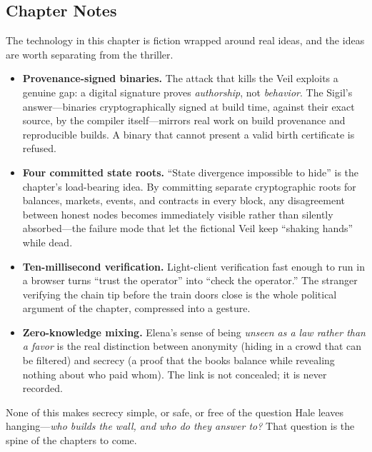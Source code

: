\hypertarget{chapter-6-notes}{%
\subsection{Chapter Notes}\label{chapter-6-notes}}

The technology in this chapter is fiction wrapped around real ideas, and the
ideas are worth separating from the thriller.

\begin{itemize}
\item
  \textbf{Provenance-signed binaries.} The attack that kills the Veil exploits
  a genuine gap: a digital signature proves \emph{authorship}, not
  \emph{behavior}. The Sigil's answer---binaries cryptographically signed at
  build time, against their exact source, by the compiler itself---mirrors real
  work on build provenance and reproducible builds. A binary that cannot
  present a valid birth certificate is refused.
\item
  \textbf{Four committed state roots.} ``State divergence impossible to hide''
  is the chapter's load-bearing idea. By committing separate cryptographic
  roots for balances, markets, events, and contracts in every block, any
  disagreement between honest nodes becomes immediately visible rather than
  silently absorbed---the failure mode that let the fictional Veil keep
  ``shaking hands'' while dead.
\item
  \textbf{Ten-millisecond verification.} Light-client verification fast enough
  to run in a browser turns ``trust the operator'' into ``check the operator.''
  The stranger verifying the chain tip before the train doors close is the
  whole political argument of the chapter, compressed into a gesture.
\item
  \textbf{Zero-knowledge mixing.} Elena's sense of being \emph{unseen as a law
  rather than a favor} is the real distinction between anonymity (hiding in a
  crowd that can be filtered) and secrecy (a proof that the books balance while
  revealing nothing about who paid whom). The link is not concealed; it is
  never recorded.
\end{itemize}

None of this makes secrecy simple, or safe, or free of the question Hale
leaves hanging---\emph{who builds the wall, and who do they answer to?} That
question is the spine of the chapters to come.
